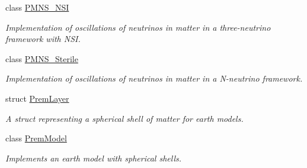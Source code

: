 \begin{DoxyCompactItemize}
class \hyperlink{classOscProb_1_1PMNS__NSI}{P\+M\+N\+S\+\_\+\+N\+SI}
\begin{DoxyCompactList}\small\item\em Implementation of oscillations of neutrinos in matter in a three-\/neutrino framework with N\+SI. \end{DoxyCompactList}\item 
class \hyperlink{classOscProb_1_1PMNS__Sterile}{P\+M\+N\+S\+\_\+\+Sterile}
\begin{DoxyCompactList}\small\item\em Implementation of oscillations of neutrinos in matter in a N-\/neutrino framework. \end{DoxyCompactList}\item 
struct \hyperlink{structOscProb_1_1PremLayer}{Prem\+Layer}
\begin{DoxyCompactList}\small\item\em A struct representing a spherical shell of matter for earth models. \end{DoxyCompactList}\item 
class \hyperlink{classOscProb_1_1PremModel}{Prem\+Model}
\begin{DoxyCompactList}\small\item\em Implements an earth model with spherical shells. \end{DoxyCompactList}\end{DoxyCompactItemize}
